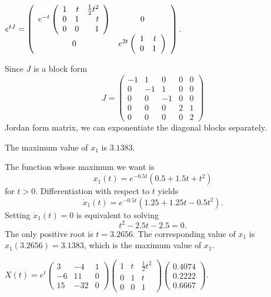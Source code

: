 \documentclass{ximera}
\begin{document}
\ans $e^{tJ}= \left(\begin{array}{cc} e^{-t}\left(\begin{array}{rrr} 
 1 & t & \frac{1}{2}t^2\\ 0 & 1 & t\\ 0 & 0 & 1\end{array}\right) & 0\\ 0 &e^{2t}\left(\begin{array}{rr} 1 & t\\ 0 &1\end{array}\right)\end{array}\right)$.

\soln Since $J$ is a block form
\[
J = \left(\begin{array}{rrr|rr} 
-1 &  1 &  0 &  0 & 0 \\ 
 0 & -1 &  1 &  0 & 0 \\
 0 &  0 & -1 &  0 & 0 \\
\hline
 0 &  0 &  0 &  2 & 1 \\
 0 &  0 &  0 &  0 & 2
\end{array}\right)
\]
Jordan form matrix, we can exponentiate the diagonal blocks separately.

 \ans The maximum value of $x_1$ is $3.1383$.

\soln The function whose maximum we want is 
\[
x_1(t)  =  e^{-0.5t}(0.5 + 1.5t + t^2)
\]
for $t>0$.  Differentiation with respect to $t$ yields 
\[
\dot{x}_1(t) = e^{-0.5t}(1.25 + 1.25t - 0.5t^2).
\]
Setting $\dot{x}_1(t) = 0$ is equivalent to solving 
\[
t^2 - 2.5t - 2.5 = 0.
\]
The only positive root is $t=3.2656$.  The corresponding value of $x_1$ is
$x_1(3.2656) = 3.1383$, which is the maximum value of $x_1$.

\ans $X(t) = e^t\left(\begin{array}{rrr}
     3  &  -4   &   1\\
    -6   &  11   &   0\\
    15   & -32   &   0 \end{array}\right)
\left(\begin{array}{rrr}
     1  &  t   &   \frac{1}{2}t^2\\
    0   &  1   &   t\\
    0   &  0   &   1 \end{array}\right)
\left(\begin{array}{r} 0.4074\\ 0.2222\\ 0.6667\end{array}\right)$.

\vspace{0.08in}
\end{document}

